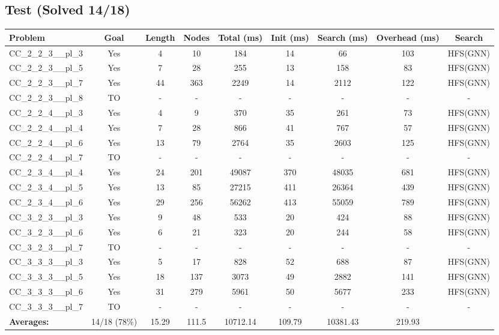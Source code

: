 \documentclass{article}
\begin{document}
\subsection*{Test (Solved 14/18)}
\begin{tabular}{lcccccccc}
\toprule
Problem & Goal & Length & Nodes & Total (ms) & Init (ms) & Search (ms) & Overhead (ms) & Search \\
\midrule
CC\_2\_2\_3\_\_pl\_3 & Yes & 4 & 10 & 184 & 14 & 66 & 103 & HFS(GNN) \\
CC\_2\_2\_3\_\_pl\_5 & Yes & 7 & 28 & 255 & 13 & 158 & 83 & HFS(GNN) \\
CC\_2\_2\_3\_\_pl\_7 & Yes & 44 & 363 & 2249 & 14 & 2112 & 122 & HFS(GNN) \\
CC\_2\_2\_3\_\_pl\_8 & TO & - & - & - & - & - & - & - \\
CC\_2\_2\_4\_\_pl\_3 & Yes & 4 & 9 & 370 & 35 & 261 & 73 & HFS(GNN) \\
CC\_2\_2\_4\_\_pl\_4 & Yes & 7 & 28 & 866 & 41 & 767 & 57 & HFS(GNN) \\
CC\_2\_2\_4\_\_pl\_6 & Yes & 13 & 79 & 2764 & 35 & 2603 & 125 & HFS(GNN) \\
CC\_2\_2\_4\_\_pl\_7 & TO & - & - & - & - & - & - & - \\
CC\_2\_3\_4\_\_pl\_4 & Yes & 24 & 201 & 49087 & 370 & 48035 & 681 & HFS(GNN) \\
CC\_2\_3\_4\_\_pl\_5 & Yes & 13 & 85 & 27215 & 411 & 26364 & 439 & HFS(GNN) \\
CC\_2\_3\_4\_\_pl\_6 & Yes & 29 & 256 & 56262 & 413 & 55059 & 789 & HFS(GNN) \\
CC\_3\_2\_3\_\_pl\_3 & Yes & 9 & 48 & 533 & 20 & 424 & 88 & HFS(GNN) \\
CC\_3\_2\_3\_\_pl\_6 & Yes & 6 & 21 & 323 & 20 & 244 & 58 & HFS(GNN) \\
CC\_3\_2\_3\_\_pl\_7 & TO & - & - & - & - & - & - & - \\
CC\_3\_3\_3\_\_pl\_3 & Yes & 5 & 17 & 828 & 52 & 688 & 87 & HFS(GNN) \\
CC\_3\_3\_3\_\_pl\_5 & Yes & 18 & 137 & 3073 & 49 & 2882 & 141 & HFS(GNN) \\
CC\_3\_3\_3\_\_pl\_6 & Yes & 31 & 279 & 5961 & 50 & 5677 & 233 & HFS(GNN) \\
CC\_3\_3\_3\_\_pl\_7 & TO & - & - & - & - & - & - & - \\
\textbf{Averages:} & 14/18 (78\%) & 15.29 & 111.5 & 10712.14 & 109.79 & 10381.43 & 219.93 & \\
\bottomrule
\end{tabular}
\\[0.7cm]
\end{document}
